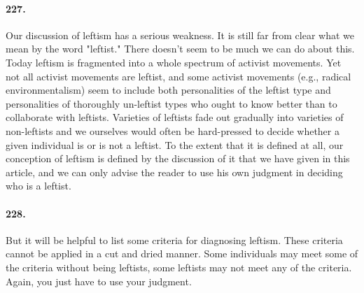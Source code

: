 \documentclass[12pt]{book}
\begin{document}
\paragraph{227.} Our discussion of leftism has a serious weakness. It is still far from clear what we mean by the word "leftist." There doesn't seem to be much we can do about this. Today leftism is fragmented into a whole spectrum of activist movements. Yet not all activist movements are leftist, and some activist movements (e.g., radical environmentalism) seem to include both personalities of the leftist type and personalities of thoroughly un-leftist types who ought to know better than to collaborate with leftists. Varieties of leftists fade out gradually into varieties of non-leftists and we ourselves would often be hard-pressed to decide whether a given individual is or is not a leftist. To the extent that it is defined at all, our conception of leftism is defined by the discussion of it that we have given in this article, and we can only advise the reader to use his own judgment in deciding who is a leftist.


\paragraph{228.}  But it will be helpful to list some criteria for diagnosing leftism.  These criteria cannot be applied in a cut and dried manner. Some individuals may meet some of the criteria without being leftists, some leftists may not meet any of the criteria. Again, you just have to use your judgment.
\end{document}
